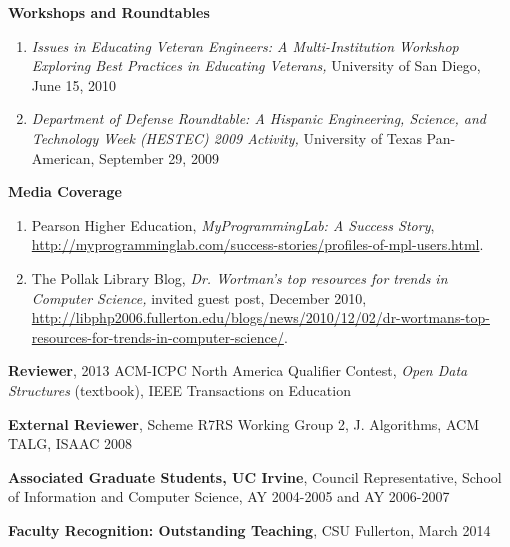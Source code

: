 \documentclass[11pt]{letter}
\begin{document}
\textbf{Workshops and Roundtables}
\begin{enumerate}
\item \emph{Issues in Educating Veteran Engineers: A Multi-Institution Workshop Exploring Best Practices in Educating Veterans,} University of San Diego, June 15, 2010
\item \emph{Department of Defense Roundtable: A Hispanic Engineering, Science, and Technology Week (HESTEC) 2009 Activity,} University of Texas Pan-American, September 29, 2009
\end{enumerate}

\textbf{Media Coverage}
\begin{enumerate}
\item Pearson Higher Education, \emph{MyProgrammingLab: A Success Story}, \url{http://myprogramminglab.com/success-stories/profiles-of-mpl-users.html}.
\item The Pollak Library Blog, \emph{Dr. Wortman's top resources for trends in Computer Science,} invited guest post, December 2010, \url{http://libphp2006.fullerton.edu/blogs/news/2010/12/02/dr-wortmans-top-resources-for-trends-in-computer-science/}.
\end{enumerate}

\textbf{Reviewer}, 2013 ACM-ICPC North America Qualifier Contest, \emph{Open Data Structures} (textbook), IEEE Transactions on Education

\textbf{External Reviewer}, Scheme R7RS Working Group 2, J. Algorithms, ACM TALG, ISAAC 2008



\textbf{Associated Graduate Students, UC Irvine},  Council Representative, School of Information and Computer Science, AY 2004-2005 and AY 2006-2007 


\textbf{Faculty Recognition: Outstanding Teaching}, CSU Fullerton, March 2014
\end{document}
